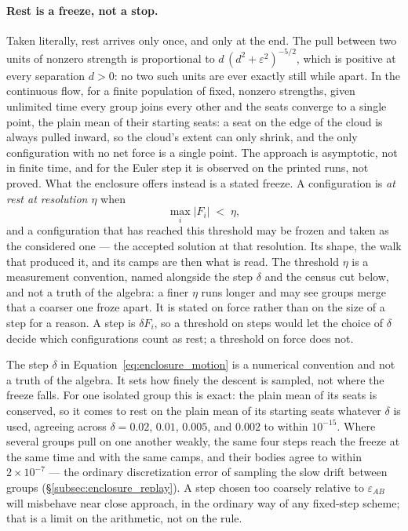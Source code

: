 \documentclass[12pt, a4paper]{article}
\begin{document}
\paragraph{Rest is a freeze, not a stop.}
Taken literally, rest arrives only once, and only at the end. The
pull between two units of nonzero strength is proportional to
$d\,(d^2+\varepsilon^2)^{-5/2}$, which is positive at every
separation $d>0$: no two such units are ever exactly still while
apart. In the continuous flow, for a finite population of fixed, nonzero strengths, given unlimited time every group joins every other and the seats converge to a single point, the plain mean of their starting seats: a seat on the edge of the cloud is always pulled inward, so the cloud's extent can only shrink, and the only configuration with no net force is a single point. The approach is asymptotic, not in finite time, and for the Euler step it is observed on the printed runs, not proved. What the enclosure offers
instead is a stated freeze. A configuration is \emph{at rest at
resolution $\eta$} when
\begin{equation}
    \max_i \lvert F_i \rvert \;<\; \eta,
    \label{eq:enclosure_freeze}
\end{equation}
and a configuration that has reached this threshold may be frozen and
taken as the considered one --- the accepted solution at that
resolution. Its shape, the walk that produced it, and its camps are
then what is read. The threshold $\eta$ is a measurement convention,
named alongside the step $\delta$ and the census cut below, and not a
truth of the algebra: a finer $\eta$ runs longer and may see groups
merge that a coarser one froze apart. It is stated on force rather
than on the size of a step for a reason. A step is $\delta F_i$, so a
threshold on steps would let the choice of $\delta$ decide which
configurations count as rest; a threshold on force does not.

The step $\delta$ in Equation~\eqref{eq:enclosure_motion} is a
numerical convention and not a truth of the algebra. It sets how
finely the descent is sampled, not where the freeze falls. For one
isolated group this is exact: the plain mean of its seats is
conserved, so it comes to rest on the plain mean of its starting
seats whatever $\delta$ is used, agreeing across
$\delta = 0.02$, $0.01$, $0.005$, and $0.002$ to within
$10^{-15}$. Where several groups pull on one another weakly, the
same four steps reach the freeze at the same time and with the same
camps, and their bodies agree to within $2\times10^{-7}$ --- the
ordinary discretization error of sampling the slow drift between
groups (\S\ref{subsec:enclosure_replay}). A step chosen too coarsely
relative to $\varepsilon_{AB}$ will misbehave near close approach,
in the ordinary way of any fixed-step scheme; that is a limit on the arithmetic, not on the rule.
\end{document}

